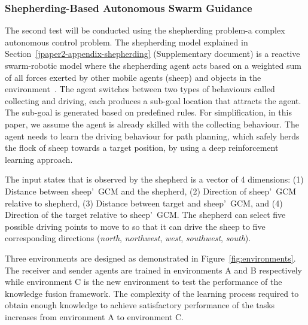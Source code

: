 \documentclass[lettersize,journal]{IEEEtran}
\begin{document}
\subsubsection{Shepherding-Based Autonomous Swarm Guidance}\label{jpaper2-experiments-transfer}

The second test will be conducted using the shepherding problem-a complex autonomous control problem. The shepherding model explained in Section~\ref{jpaper2-appendix-shepherding} (Supplementary document) is a reactive swarm-robotic model where the shepherding agent acts based on a weighted sum of all forces exerted by other mobile agents (sheep) and objects in the environment~\cite{El-Fiqilimits2020}. The agent switches between two types of behaviours called collecting and driving, each produces a sub-goal location that attracts the agent. The sub-goal is generated based on predefined rules. For simplification, in this paper, we assume the agent is already skilled with the collecting behaviour. The agent needs to learn the driving behaviour for path planning, which safely herds the flock of sheep towards a target position, by using a deep reinforcement learning approach.


The input states that is observed by the shepherd is a vector of 4 dimensions: (1) Distance between sheep\textquoteright \ GCM and the shepherd, (2) Direction of sheep\textquoteright \ GCM relative to shepherd, (3) Distance between target and sheep\textquoteright \ GCM, and (4) Direction of the target relative to sheep\textquoteright \ GCM. The shepherd can select five possible driving points to move to so that it can drive the sheep to five corresponding  directions (\textit{north}, \textit{northwest}, \textit{west}, \textit{southwest}, \textit{south}).

Three environments are designed as demonstrated in Figure~\ref{fig:environments}. The receiver and sender agents are trained in environments A and B respectively while environment C is the new environment to test the performance of the knowledge fusion framework. The complexity of the learning process required to obtain enough knowledge to achieve satisfactory performance of the tasks increases from environment A to environment C.

\begin{figure*}[!tb]

\centering
    \hspace{1.5em}
    \hspace{1.5em}
    \caption{The environments are designed to have progressively increasing complexity.}
\label{fig:environments}
\end{figure*}
\end{document}
